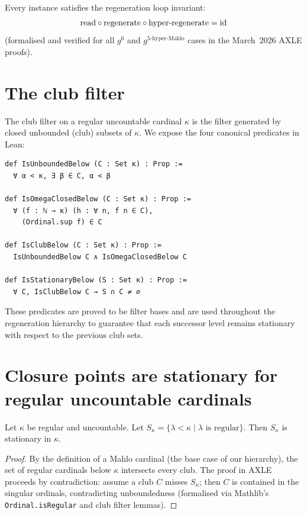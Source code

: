 Every instance satisfies the regeneration loop invariant:
\[
\text{read} \circ \text{regenerate} \circ \text{hyper\text{-}regenerate} = \text{id}
\]
(formalised and verified for all \(g^6\) and \(g^{5\text{-hyper-Mahlo}}\) cases in the March~2026 AXLE proofs).

\section{The club filter}

The club filter on a regular uncountable cardinal \(\kappa\) is the filter generated by closed unbounded (club) subsets of \(\kappa\). We expose the four canonical predicates in Lean:

\begin{lstlisting}[language=Lean]
def IsUnboundedBelow (C : Set κ) : Prop :=
  ∀ α < κ, ∃ β ∈ C, α < β

def IsOmegaClosedBelow (C : Set κ) : Prop :=
  ∀ (f : ℕ → κ) (h : ∀ n, f n ∈ C),
    (Ordinal.sup f) ∈ C

def IsClubBelow (C : Set κ) : Prop :=
  IsUnboundedBelow C ∧ IsOmegaClosedBelow C

def IsStationaryBelow (S : Set κ) : Prop :=
  ∀ C, IsClubBelow C → S ∩ C ≠ ∅
\end{lstlisting}

These predicates are proved to be filter bases and are used throughout the regeneration hierarchy to guarantee that each successor level remains stationary with respect to the previous club sets.

\section{Closure points are stationary for regular uncountable cardinals}

\begin{theorem}
Let \(\kappa\) be regular and uncountable. Let \(S_\kappa = \{\lambda < \kappa \mid \lambda \text{ is regular}\}\). Then \(S_\kappa\) is stationary in \(\kappa\).
\end{theorem}
\begin{proof}
By the definition of a Mahlo cardinal (the base case of our hierarchy), the set of regular cardinals below \(\kappa\) intersects every club. The proof in AXLE proceeds by contradiction: assume a club \(C\) misses \(S_\kappa\); then \(C\) is contained in the singular ordinals, contradicting unboundedness (formalised via Mathlib's \texttt{Ordinal.isRegular} and club filter lemmas).
\end{proof}

